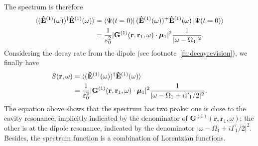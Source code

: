 The spectrum is therefore
\begin{align}
\mathinner{\langle{(\mathbf{\hat{E}}^{(1)}(\omega))^\dagger\mathbf{\hat{E}}^{(1)}(\omega)}\rangle}
&=\mathinner{\langle{\Psi(t=0)}|}(\mathbf{\hat{E}}^{(1)}(\omega))^+ \mathbf{\hat{E}}^{(1)}(\omega)\mathinner{|{\Psi(t=0)}\rangle} \nonumber\\
&= \frac{1}{\varepsilon_0^2}|\mathbf{G}^{(1)}(\mathbf{r},\mathbf{r}_1,\omega)\cdot
{\bm\mu_1}|^2 \frac{1}{|\omega-\Omega_1|^2}.
\end{align}
Considering the decay rate from the dipole (see footnote~\ref{fn:decayrevision}), we finally have
\begin{align}
S({\bf r},\omega) &= \mathinner{\langle{(\mathbf{\hat{E}}^{(1)}(\omega))^\dagger\mathbf{\hat{E}}^{(1)}(\omega)}\rangle} \nonumber \\ &= \frac{1}{\varepsilon_0^2} |\mathbf{G}^{(1)}(\mathbf{r},\mathbf{r}_1,\omega)\cdot
{\bm\mu_1}|^2 \frac{1}{|\omega-\Omega_1+i\Gamma_1/2|^2}.\label{eq:spec_1dipole}
\end{align}
The equation above shows that the spectrum has two peaks: one is close to the cavity resonance, implicitly indicated by the denominator of $\mathbf{G}^{(1)}(\mathbf{r},\mathbf{r}_1,\omega)$; the other is at the dipole resonance,
indicated by the denominator $|\omega-\Omega_1+i\Gamma_1/2|^2$.
Besides, the spectrum function is a combination of Lorentzian functions.
%
%


